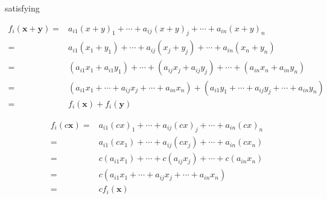 \documentclass[
]{book}
\theoremstyle{definition}
\theoremstyle{definition}
\theoremstyle{definition}
\theoremstyle{definition}
\theoremstyle{remark}
\begin{document}
satisfying

\[
\begin{aligned}
f_{{\scriptscriptstyle i}}\left(\boldsymbol{x}+\boldsymbol{y}\right)= & a_{{\scriptscriptstyle i1}}\left(x+y\right)_{{\scriptscriptstyle 1}}+\cdots+a_{{\scriptscriptstyle ij}}\left(x+y\right)_{{\scriptscriptstyle j}}+\cdots+a_{{\scriptscriptstyle in}}\left(x+y\right)_{{\scriptscriptstyle n}}\\
= & a_{{\scriptscriptstyle i1}}\left(x_{{\scriptscriptstyle 1}}+y_{{\scriptscriptstyle 1}}\right)+\cdots+a_{{\scriptscriptstyle ij}}\left(x_{{\scriptscriptstyle j}}+y_{{\scriptscriptstyle j}}\right)+\cdots+a_{{\scriptscriptstyle in}}\left(x_{{\scriptscriptstyle n}}+y_{{\scriptscriptstyle n}}\right)\\
= & \left(a_{{\scriptscriptstyle i1}}x_{{\scriptscriptstyle 1}}+a_{{\scriptscriptstyle i1}}y_{{\scriptscriptstyle 1}}\right)+\cdots+\left(a_{{\scriptscriptstyle ij}}x_{{\scriptscriptstyle j}}+a_{{\scriptscriptstyle ij}}y_{{\scriptscriptstyle j}}\right)+\cdots+\left(a_{{\scriptscriptstyle in}}x_{{\scriptscriptstyle n}}+a_{{\scriptscriptstyle in}}y_{{\scriptscriptstyle n}}\right)\\
= & \left(a_{{\scriptscriptstyle i1}}x_{{\scriptscriptstyle 1}}+\cdots+a_{{\scriptscriptstyle ij}}x_{{\scriptscriptstyle j}}+\cdots+a_{{\scriptscriptstyle in}}x_{{\scriptscriptstyle n}}\right)+\left(a_{{\scriptscriptstyle i1}}y_{{\scriptscriptstyle 1}}+\cdots+a_{{\scriptscriptstyle ij}}y_{{\scriptscriptstyle j}}+\cdots+a_{{\scriptscriptstyle in}}y_{{\scriptscriptstyle n}}\right)\\
= & f_{{\scriptscriptstyle i}}\left(\boldsymbol{x}\right)+f_{{\scriptscriptstyle i}}\left(\boldsymbol{y}\right)
\end{aligned}
\]

\[
\begin{aligned}
f_{{\scriptscriptstyle i}}\left(c\boldsymbol{x}\right)= & a_{{\scriptscriptstyle i1}}\left(cx\right)_{{\scriptscriptstyle 1}}+\cdots+a_{{\scriptscriptstyle ij}}\left(cx\right)_{{\scriptscriptstyle j}}+\cdots+a_{{\scriptscriptstyle in}}\left(cx\right)_{{\scriptscriptstyle n}}\\
= & a_{{\scriptscriptstyle i1}}\left(cx_{{\scriptscriptstyle 1}}\right)+\cdots+a_{{\scriptscriptstyle ij}}\left(cx_{{\scriptscriptstyle j}}\right)+\cdots+a_{{\scriptscriptstyle in}}\left(cx_{{\scriptscriptstyle n}}\right)\\
= & c\left(a_{{\scriptscriptstyle i1}}x_{{\scriptscriptstyle 1}}\right)+\cdots+c\left(a_{{\scriptscriptstyle ij}}x_{{\scriptscriptstyle j}}\right)+\cdots+c\left(a_{{\scriptscriptstyle in}}x_{{\scriptscriptstyle n}}\right)\\
= & c\left(a_{{\scriptscriptstyle i1}}x_{{\scriptscriptstyle 1}}+\cdots+a_{{\scriptscriptstyle ij}}x_{{\scriptscriptstyle j}}+\cdots+a_{{\scriptscriptstyle in}}x_{{\scriptscriptstyle n}}\right)\\
= & cf_{{\scriptscriptstyle i}}\left(\boldsymbol{x}\right)
\end{aligned}
\]
\end{document}
